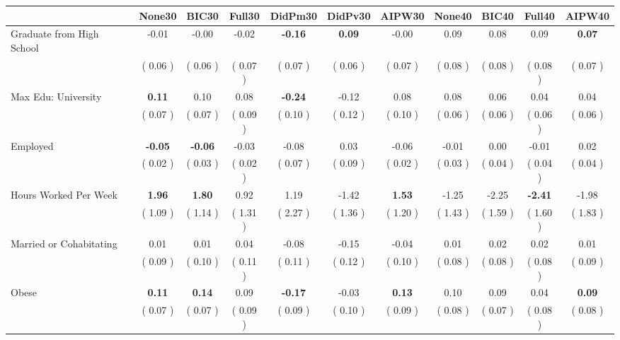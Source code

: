 \begin{tabular}{l c c c c c c c c c c}
\toprule
 & None30 & BIC30 & Full30 & DidPm30 & DidPv30 & AIPW30 & None40 & BIC40 & Full40 & AIPW40 \\
\midrule
Graduate from High School &     -0.01 &     -0.00 &     -0.02 & \textbf{     -0.16 } & \textbf{      0.09 } &     -0.00 &      0.09 &      0.08 &      0.09 & \textbf{     0.07} \\
& (     0.06 ) & (     0.06 ) & (     0.07 ) & (     0.07 ) & (     0.06 ) & (     0.07 ) & (     0.08 ) & (     0.08 ) & (     0.08 ) & (     0.07 ) \\
Max Edu: University & \textbf{      0.11 } &      0.10 &      0.08 & \textbf{     -0.24 } &     -0.12 &      0.08 &      0.08 &      0.06 &      0.04 &      0.04 \\
& (     0.07 ) & (     0.07 ) & (     0.09 ) & (     0.10 ) & (     0.12 ) & (     0.10 ) & (     0.06 ) & (     0.06 ) & (     0.06 ) & (     0.06 ) \\
Employed & \textbf{     -0.05 } & \textbf{     -0.06 } &     -0.03 &     -0.08 &      0.03 &     -0.06 &     -0.01 &      0.00 &     -0.01 &      0.02 \\
& (     0.02 ) & (     0.03 ) & (     0.02 ) & (     0.07 ) & (     0.09 ) & (     0.02 ) & (     0.03 ) & (     0.04 ) & (     0.04 ) & (     0.04 ) \\
Hours Worked Per Week & \textbf{      1.96 } & \textbf{      1.80 } &      0.92 &      1.19 &     -1.42 & \textbf{     1.53} &     -1.25 &     -2.25 & \textbf{     -2.41 } &     -1.98 \\
& (     1.09 ) & (     1.14 ) & (     1.31 ) & (     2.27 ) & (     1.36 ) & (     1.20 ) & (     1.43 ) & (     1.59 ) & (     1.60 ) & (     1.83 ) \\
Married or Cohabitating &      0.01 &      0.01 &      0.04 &     -0.08 &     -0.15 &     -0.04 &      0.01 &      0.02 &      0.02 &      0.01 \\
& (     0.09 ) & (     0.10 ) & (     0.11 ) & (     0.11 ) & (     0.12 ) & (     0.10 ) & (     0.08 ) & (     0.08 ) & (     0.08 ) & (     0.09 ) \\
Obese & \textbf{      0.11 } & \textbf{      0.14 } &      0.09 & \textbf{     -0.17 } &     -0.03 & \textbf{     0.13} &      0.10 &      0.09 &      0.04 & \textbf{     0.09} \\
& (     0.07 ) & (     0.07 ) & (     0.09 ) & (     0.09 ) & (     0.10 ) & (     0.09 ) & (     0.08 ) & (     0.07 ) & (     0.08 ) & (     0.08 ) \\

\end{tabular}

